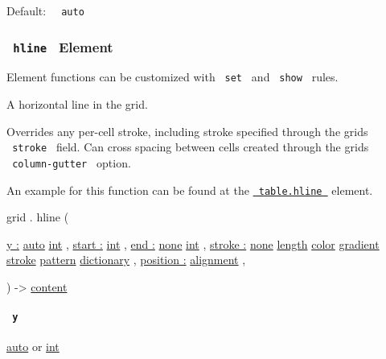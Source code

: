 Default: \texttt{\ }{\texttt{\ auto\ }}\texttt{\ }

\subsubsection{\texorpdfstring{\texttt{\ hline\ } {{ Element
}}}{ hline   Element }}\label{definitions-hline}

\label{definitions-hline-element-tooltip}
Element functions can be customized with \texttt{\ set\ } and
\texttt{\ show\ } rules.

A horizontal line in the grid.

Overrides any per-cell stroke, including stroke specified through the
grid\textquotesingle s \texttt{\ stroke\ } field. Can cross spacing
between cells created through the grid\textquotesingle s
\texttt{\ column-gutter\ } option.

An example for this function can be found at the
\href{/docs/reference/model/table/\#definitions-hline}{\texttt{\ table.hline\ }}
element.

grid { . } { hline } (

{ \hyperref[definitions-hline-parameters-y]{y :}
\href{/docs/reference/foundations/auto/}{auto}
\href{/docs/reference/foundations/int/}{int} , } {
\hyperref[definitions-hline-parameters-start]{start :}
\href{/docs/reference/foundations/int/}{int} , } {
\hyperref[definitions-hline-parameters-end]{end :}
\href{/docs/reference/foundations/none/}{none}
\href{/docs/reference/foundations/int/}{int} , } {
\hyperref[definitions-hline-parameters-stroke]{stroke :}
\href{/docs/reference/foundations/none/}{none}
\href{/docs/reference/layout/length/}{length}
\href{/docs/reference/visualize/color/}{color}
\href{/docs/reference/visualize/gradient/}{gradient}
\href{/docs/reference/visualize/stroke/}{stroke}
\href{/docs/reference/visualize/pattern/}{pattern}
\href{/docs/reference/foundations/dictionary/}{dictionary} , } {
\hyperref[definitions-hline-parameters-position]{position :}
\href{/docs/reference/layout/alignment/}{alignment} , }

) -\textgreater{} \href{/docs/reference/foundations/content/}{content}

\paragraph{\texorpdfstring{\texttt{\ y\ }}{ y }}\label{definitions-hline-y}

\href{/docs/reference/foundations/auto/}{auto} {or}
\href{/docs/reference/foundations/int/}{int}

